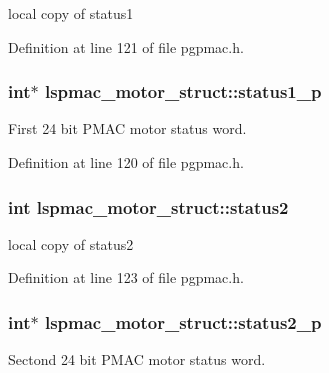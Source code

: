 local copy of status1 



Definition at line 121 of file pgpmac.\-h.

\hypertarget{structlspmac__motor__struct_a56c41875faf19c643e97c10519e6eb8c}{
\subsubsection[{status1\-\_\-p}]{\setlength{\rightskip}{0pt plus 5cm}int$\ast$ lspmac\-\_\-motor\-\_\-struct\-::status1\-\_\-p}}\label{structlspmac__motor__struct_a56c41875faf19c643e97c10519e6eb8c}


First 24 bit P\-M\-A\-C motor status word. 



Definition at line 120 of file pgpmac.\-h.

\hypertarget{structlspmac__motor__struct_a6a412224c09268c1dc92de9c2a1a2512}{
\subsubsection[{status2}]{\setlength{\rightskip}{0pt plus 5cm}int lspmac\-\_\-motor\-\_\-struct\-::status2}}\label{structlspmac__motor__struct_a6a412224c09268c1dc92de9c2a1a2512}


local copy of status2 



Definition at line 123 of file pgpmac.\-h.

\hypertarget{structlspmac__motor__struct_a2b33ef6e12717459c1e9967cc6e659c6}{
\subsubsection[{status2\-\_\-p}]{\setlength{\rightskip}{0pt plus 5cm}int$\ast$ lspmac\-\_\-motor\-\_\-struct\-::status2\-\_\-p}}\label{structlspmac__motor__struct_a2b33ef6e12717459c1e9967cc6e659c6}


Sectond 24 bit P\-M\-A\-C motor status word. 



